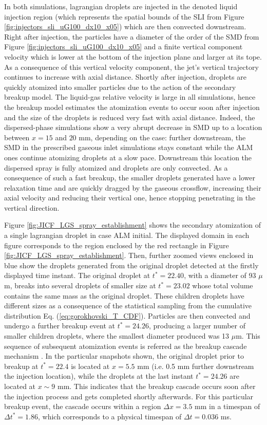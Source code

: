 In both simulations, lagrangian droplets are injected in the denoted liquid injection region (which represents the spatial bounds of the SLI from Figure \ref{fig:injectors_sli_uG100_dx10_x05}) which are then convected downstream. Right after injection, the particles have a diameter of the order of the SMD from Figure \ref{fig:injectors_sli_uG100_dx10_x05} and a finite vertical component velocity which is lower at the bottom of the injection plane and larger at its tope. As a consequence of this vertical velocity component, the jet's vertical trajectory continues to increase with axial distance. Shortly after injection, droplets are quickly atomized into smaller particles due to the action of the secondary breakup model. The liquid-gas relative velocity is large in all simulations, hence the breakup model estimates the atomization events to occur soon after injection and the size of the droplets is reduced very fast with axial distance. Indeed, the dispersed-phase simulations show a very abrupt decrease in SMD up to a location between $x = 15$ and $20$ mm, depending on the case: further downstream, the SMD in the prescribed gaseous inlet simulations stays constant while the ALM ones continue atomizing droplets at a slow pace. Downstream this location the dispersed spray is fully atomized and droplets are only convected. As a consequence of such a fast breakup, the smaller droplets generated have a lower relaxation time and are quickly dragged by the gaseous crossflow, increasing their axial velocity and reducing their vertical one, hence stopping penetrating in the vertical direction. 

Figure \ref{fig:JICF_LGS_spray_establishment} shows the secondary atomization of a single lagrangian droplet in case ALM initial. The displayed domain in each figure corresponds to the region enclosed by the red rectangle in Figure \ref{fig:JICF_LGS_spray_establishment}. Then, further zoomed views enclosed in blue show the droplets generated from the original droplet detected at the firstly displayed time instant. The original droplet at $t^* = 22.40$, with a diameter of 93 $\mu$m, breaks into several droplets of smaller size at $t^* = 23.02$ whose total volume contains the same mass as the original droplet. These children droplets have different sizes as a consequence of the statistical sampling from the cumulative distribution Eq. (\ref{eq:gorokhovski_T_CDF}). Particles are then convected and undergo a further breakup event at $t^* = 24.26$, producing a larger number of smaller children droplets, where the smallest diameter produced was 13 $\mu$m. This sequence of subsequent atomization events is referred as the breakup cascade mechanism . In the particular snapshots shown, the original droplet prior to breakup at $t^* = 22.4$ is located at $x = 5.5$ mm (i.e. 0.5 mm further downstream the injection location), while the droplets at the last instant $t^* = 24.26$ are located at $x \sim 9$ mm. This indicates that the breakup cascade occurs soon after the injection process and gets completed shortly afterwards. For this particular breakup event, the cascade occurs within a region $\Delta x = 3.5$ mm in a timespan of $\Delta t^* = 1.86$, which corresponds to a physical timespan of $\Delta t = 0.036$ ms. 



